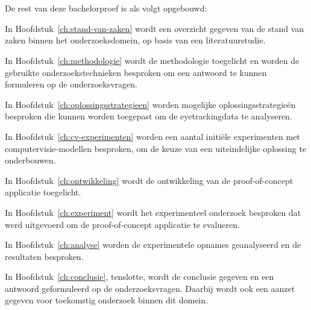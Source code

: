 \section{}%
\label{sec:opzet-bachelorproef}


De rest van deze bachelorproef is als volgt opgebouwd:

In Hoofdstuk~\ref{ch:stand-van-zaken} wordt een overzicht gegeven van de stand van zaken binnen het onderzoeksdomein, op basis van een literatuurstudie.

In Hoofdstuk~\ref{ch:methodologie} wordt de methodologie toegelicht en worden de gebruikte onderzoekstechnieken besproken om een antwoord te kunnen formuleren op de onderzoeksvragen.

In Hoofdstuk~\ref{ch:oplossingsstrategieen} worden mogelijke oplossingsstrategieën besproken die kunnen worden toegepast om de eyetrackingdata te analyseren.

In Hoofdstuk~\ref{ch:cv-experimenten} worden een aantal initiële experimenten met computervisie-modellen besproken, om de keuze van een uiteindelijke oplossing te onderbouwen.

In Hoofdstuk~\ref{ch:ontwikkeling} wordt de ontwikkeling van de proof-of-concept applicatie toegelicht.

In Hoofdstuk~\ref{ch:experiment} wordt het experimenteel onderzoek besproken dat werd uitgevoerd om de proof-of-concept applicatie te evalueren.

In Hoofdstuk~\ref{ch:analyse} worden de experimentele opnames geanalyseerd en de resultaten besproken.

In Hoofdstuk~\ref{ch:conclusie}, tenslotte, wordt de conclusie gegeven en een antwoord geformuleerd op de onderzoeksvragen. Daarbij wordt ook een aanzet gegeven voor toekomstig onderzoek binnen dit domein.